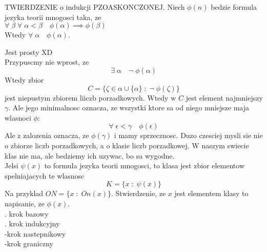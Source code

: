 \documentclass{article}
\begin{document}
    \bigskip
    \begin{center}\large
        TWIERDZENIE o indukcji PZOASKONCZONEJ. Niech $\phi(n)$ bedzie formula jezyka teorii mnogosci taka, ze\smallskip\\
        $\forall\;\beta\;\forall\;\alpha<\beta\quad \phi(\alpha)\implies \phi(\beta)$\smallskip\\
        Wtedy $\forall\;\alpha\quad \phi(\alpha)$.
    \end{center}
    \dowod
    Jest prosty XD\medskip\\
    Przypuscmy nie wprost, ze 
    $$\exists\;\alpha\quad\neg\;\phi(\alpha)$$
    Wtedy zbior 
    $$C=\{\zeta\in\alpha\cup\{\alpha\}\;:\;\neg\;\phi(\zeta)\}$$
    jest niepustym zbiorem liiczb porzadkowych. Wtedy w $C$ jest element najmniejszy $\gamma$. Ale jego minimalnosc oznacza, ze wszystki ktore sa od niego mniejsze maja wlasnoci $\phi$:
    $$\forall\;\epsilon<\gamma\quad \phi(\epsilon)$$
    Ale z zalozenia oznacza, ze $\phi(\gamma)$ i mamy sprzecznosc.
    \kondow
    Duzo czesciej mysli sie nie o zbiorze liczb porzadkowych, a o klasie liczb porzadkowej. W naszym swiecie klas nie ma, ale bedziemy ich uzywac, bo sa wygodne.\smallskip\\
    Jelsi $\psi(x)$ to formula jezyka teorii mnogosci, to klasa jest zbior elementow spelniajacych te wlasnosc
    $$K=\{x\;:\;\psi(x)\}$$
    Na przyklad $ON = \{x\;:\;On(x)\}$. Stwierdzenie, ze $x$ jest elementem klasy to napisanie, ze $\phi(x)$.\medskip\\
    . krok bazowy\smallskip\\
    . krok indukcyjny\smallskip\\
    \indent\indent-krok nastepnikowy\smallskip\\
    \indent\indent-krok graniczny
\end{document}
